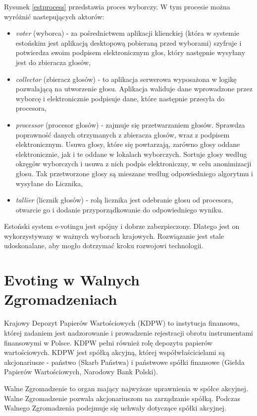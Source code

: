\documentclass[a4paper,12pt]{book}
\begin{document}
Rysunek \ref{estprocess} przedstawia proces wyborczy. W tym procesie można wyróżnić nastepujących aktorów:
\begin{itemize}
\item \textit{voter} (wyborca) - za pośrednictwem aplikacji klienckiej (która w systemie estońskim jest aplikacją desktopową pobieraną przed wyborami) szyfruje i potwierdza swoim podpisem elektronicznym głos, który następnie wysyłany jest do zbieracza głosów,
\item \textit{collector} (zbieracz głosów) - to aplikacja serwerowa wyposażona w logikę pozwalającą na utworzenie głosu. Aplikacja waliduje dane wprowadzone przez wyborcę i elektronicznie podpisuje dane, które następnie przesyła do procesora,
\item \textit{processor} (procesor głosów) - zajmuje się przetwarzaniem głosów. Sprawdza poprawność danych otrzymanych z zbieracza głosów, wraz z podpisem elektronicznym. Usuwa głosy, które się powtarzają, zarówno głosy oddane elektronicznie, jak i te oddane w lokalach wyborczych. Sortuje głosy według okręgów wyborczych i usuwa z nich podpis elektroniczny, w celu anonimizacji głosu. Tak przetworzone głosy są mieszane według odpowiedniego algorytmu i wysyłane do Licznika,
\item \textit{tallier} (licznik głosów) - rolą licznika jest odebranie głosu od procesora, otwarcie go i dodanie przyporządkowanie do odpowiedniego wyniku.
\end{itemize}

Estoński system e-votingu jest spójny i dobrze zabezpieczony. Dlatego jest on wykorzystywany w ważnych wyborach krajowych. Rozwiązanie jest stale udoskonalane, aby mogło dotrzymać kroku rozwojowi technologii.\cite{estonian:voting}

\section{Evoting w Walnych Zgromadzeniach}

Krajowy Depozyt Papierów Wartościowych (KDPW) to instytucja finansowa, której zadaniem jest nadzorowanie i prowadzenie rejestracji obrotu instrumentami finansowymi w Polsce. KDPW pełni również rolę depozytu papierów wartościowych. KDPW jest spółką akcyjną, której współwłaścicielami są akcjonariusze - państwo (Skarb Państwa) i państwowe spółki finansowe (Giełda Papierów Wartościowych, Narodowy Bank Polski).

Walne Zgromadzenie to organ mający najwyższe uprawnienia w spółce akcyjnej. Walne Zgromadzenie pozwala akcjonariuszom na zarządzanie spółką. Podczas Walnego Zgromadzenia podejmuje się uchwały dotyczące spółki akcyjnej.
\end{document}
